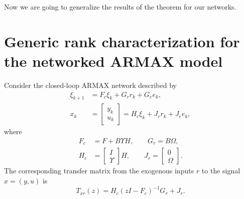 \documentclass[11pt,a4paper]{article}
\begin{document}
Now we are going to generalize the results of the theorem for our networks.

\section{Generic rank characterization for the networked ARMAX model}

Consider the closed-loop ARMAX network described by
\begin{align}\label{eq:cl-x}
    \xi_{k+1} &= F_c \xi_k + G_r r_k + G_e e_k,\\
        x_k &= \begin{bmatrix} y_k \\ u_k \end{bmatrix}  = H_c \xi_k + J_r r_k + J_e e_k,
\end{align}
where
\begin{align*}
    F_c &= F + B\Upsilon H, \qquad G_r = B\Omega,\\
    H_c &= \begin{bmatrix} I \\ \Upsilon \end{bmatrix} H, \qquad J_r = \begin{bmatrix} 0 \\ \Omega \end{bmatrix}.
\end{align*}
The corresponding transfer matrix from the exogenous inputs $r$ to the signal $x=(y,u)$ is
\begin{equation}
\label{eq:Txr}
T_{xr}(z) = H_c (zI-F_c)^{-1} G_r + J_r .
\end{equation}
\end{document}
